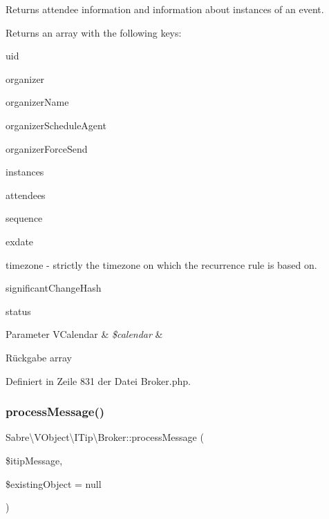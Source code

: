 Returns attendee information and information about instances of an event.

Returns an array with the following keys\+:


\begin{DoxyEnumerate}
\item uid
\item organizer
\item organizer\+Name
\item organizer\+Schedule\+Agent
\item organizer\+Force\+Send
\item instances
\item attendees
\item sequence
\item exdate
\item timezone -\/ strictly the timezone on which the recurrence rule is based on.
\item significant\+Change\+Hash
\item status 
\begin{DoxyParams}[1]{Parameter}
V\+Calendar & {\em \$calendar} & \\
\hline
\end{DoxyParams}
\begin{DoxyReturn}{Rückgabe}
array 
\end{DoxyReturn}

\end{DoxyEnumerate}

Definiert in Zeile 831 der Datei Broker.\+php.

\mbox{\label{class_sabre_1_1_v_object_1_1_i_tip_1_1_broker_a434d78cfdc58d31dd1342b1d2ed19a7e}} 
\subsubsection{\texorpdfstring{process\+Message()}{processMessage()}}
{\footnotesize\ttfamily Sabre\textbackslash{}\+V\+Object\textbackslash{}\+I\+Tip\textbackslash{}\+Broker\+::process\+Message (\begin{DoxyParamCaption}\item[{\mbox{\hyperlink{class_sabre_1_1_v_object_1_1_i_tip_1_1_message}{Message}}}]{\$itip\+Message,  }\item[{\mbox{\hyperlink{class_sabre_1_1_v_object_1_1_component_1_1_v_calendar}{V\+Calendar}}}]{\$existing\+Object = {\ttfamily null} }\end{DoxyParamCaption})}


